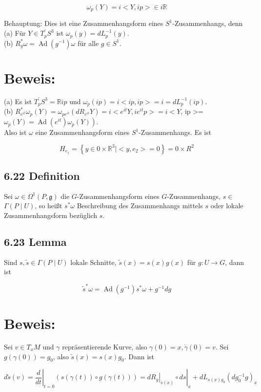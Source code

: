 \documentclass[10pt, letterpaper]{article}
\begin{document}
$$
\omega_{p}(Y)=i<Y, i p>\in i \mathbb{R}
$$

Behauptung: Dies ist eine Zusammenhangsform eines $S^{1}$-Zusammenhangs, denn\\
(a) Für $Y \in T_{p}^{\prime} S^{3}$ ist $\omega_{p}(y)=d L_{p}^{-1}(y)$.\\
(b) $R_{g}^{*} \omega=\operatorname{Ad}\left(g^{-1}\right) \omega$ für alle $g \in S^{1}$.

\section*{Beweis:}
(a) Es ist $T_{p}^{\prime} S^{3}=\mathbb{R} i p$ und $\omega_{p}(i p)=i<i p, i p>=i=d L_{p}^{-1}(i p)$.\\
(b) $R_{e^{i t}}^{*} \omega_{p}(Y)=\omega_{p e^{i t}}\left(d R_{e^{i t}} Y\right)=i<e^{i t} Y, i e^{i t} p>=i<Y$, ip >= $\left.\omega_{p}(Y)=\operatorname{Ad}\left(e^{i t}\right) \omega_{p}(Y)\right)$.\\
Also ist $\omega$ eine Zusammenhangsform eines $S^{1}$-Zusammenhangs. Es ist

$$
H_{e_{1}}=\left\{y \in 0 \times \mathbb{R}^{3} \mid<y, e_{2}>=0\right\}=0 \times R^{2}
$$

\subsection*{6.22 Definition}
Sei $\omega \in \Omega^{1}(P, \mathfrak{g})$ die $G$-Zusammenhangsform eines $G$-Zusammenhangs, $s \in$ $\Gamma(P \mid U)$, so heißt $s^{*} \omega$ Beschreibung des Zusammenhangs mittels $s$ oder lokale Zusammenhangsform bezüglich $s$.

\subsection*{6.23 Lemma}
Sind $s, \tilde{s} \in \Gamma(P \mid U)$ lokale Schnitte, $\tilde{s}(x)=s(x) g(x)$ für $g: U \rightarrow G$, dann ist

$$
\tilde{s}^{*} \omega=\operatorname{Ad}\left(g^{-1}\right) s^{*} \omega+g^{-1} d g
$$

\section*{Beweis:}
Sei $v \in T_{x} M$ und $\gamma$ repräsentierende Kurve, also $\gamma(0)=x, \dot{\gamma}(0)=v$. Sei $g(\gamma(0))=g_{0}$, also $\tilde{s}(x)=s(x) g_{0}$. Dann ist

$$
d \tilde{s}(v)=\left.\frac{d}{d t}\right|_{t=0}(s(\gamma(t)) \circ g(\gamma(t)))=\left.\left.d R_{g}\right|_{s(x)} \circ d s\right|_{x}+d L_{s(x) g_{0}}\left(d g_{0}^{-1} g\right)_{x}
$$
\end{document}
